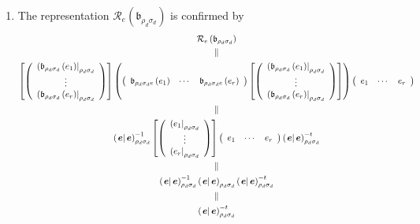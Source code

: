 \documentclass[aps,preprint]{revtex4}
\begin{document}
\begin{enumerate}
\begin{enumerate}
\item The representation $\mathcal{R}_{e}\left( \mathfrak{b}_{\rho
_{d}\sigma _{d}}\right) $ is confirmed by 
\begin{gather}
\mathcal{R}_{e}\left( \mathfrak{b}_{\rho _{d}\sigma _{d}}\right) \\
\parallel \\
\left[ \left( 
\begin{array}{c}
\left( \mathfrak{b}_{\rho _{d}\sigma _{d}}\left( e_{1}\right) \right\vert
_{\rho _{d}\sigma _{d}} \\ 
\vdots \\ 
\left( \mathfrak{b}_{\rho _{d}\sigma _{d}}\left( e_{r}\right) \right\vert
_{\rho _{d}\sigma _{d}}%
\end{array}%
\right) \right] \left( \left( 
\begin{array}{ccc}
\mathfrak{b}_{\rho _{d}\sigma _{d}e}\left( e_{1}\right) & \cdots & \mathfrak{%
b}_{\rho _{d}\sigma _{d}e}\left( e_{r}\right)%
\end{array}%
\right) \left[ \left( 
\begin{array}{c}
\left( \mathfrak{b}_{\rho _{d}\sigma _{d}}\left( e_{1}\right) \right\vert
_{\rho _{d}\sigma _{d}} \\ 
\vdots \\ 
\left( \mathfrak{b}_{\rho _{d}\sigma _{d}}\left( e_{r}\right) \right\vert
_{\rho _{d}\sigma _{d}}%
\end{array}%
\right) \right] \right) \left( 
\begin{array}{ccc}
e_{1} & \cdots & e_{r}%
\end{array}%
\right) \\
\parallel \\
\left( \left. \overset{}{\boldsymbol{e}}\right\vert \boldsymbol{e}\right)
_{\rho _{d}\sigma _{d}}^{-1}\left[ \left( 
\begin{array}{c}
\left( e_{1}\right\vert _{\rho _{d}\sigma _{d}} \\ 
\vdots \\ 
\left( e_{r}\right\vert _{\rho _{d}\sigma _{d}}%
\end{array}%
\right) \right] \left( 
\begin{array}{ccc}
e_{1} & \cdots & e_{r}%
\end{array}%
\right) \left( \left. \overset{}{\boldsymbol{e}}\right\vert \boldsymbol{e}%
\right) _{\rho _{d}\sigma _{d}}^{-t} \\
\parallel \\
\left( \left. \overset{}{\boldsymbol{e}}\right\vert \boldsymbol{e}\right)
_{\rho _{d}\sigma _{d}}^{-1}\left( \left. \overset{}{\boldsymbol{e}}%
\right\vert \boldsymbol{e}\right) _{\rho _{d}\sigma _{d}}\left( \left. 
\overset{}{\boldsymbol{e}}\right\vert \boldsymbol{e}\right) _{\rho
_{d}\sigma _{d}}^{-t} \\
\parallel \\
\left( \left. \overset{}{\boldsymbol{e}}\right\vert \boldsymbol{e}\right)
_{\rho _{d}\sigma _{d}}^{-t}
\end{gather}
\end{enumerate}


\end{enumerate}
\end{document}
